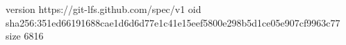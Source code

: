 version https://git-lfs.github.com/spec/v1
oid sha256:351ed66191688cae1d6d6d77e1c41e15eef5800e298b5d1ce05e907cf9963c77
size 6816
